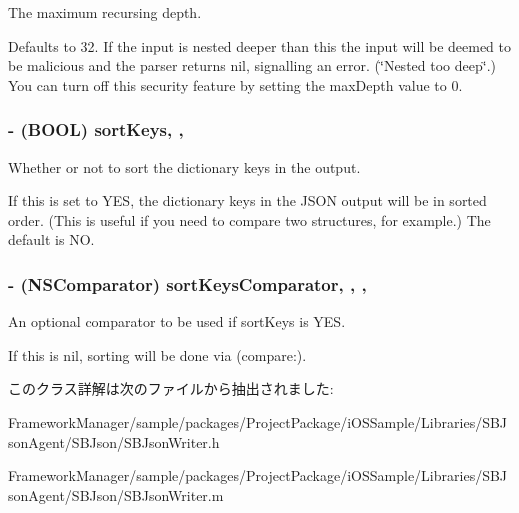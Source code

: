 The maximum recursing depth. 

Defaults to 32. If the input is nested deeper than this the input will be deemed to be malicious and the parser returns nil, signalling an error. (\char`\"{}\+Nested too deep\char`\"{}.) You can turn off this security feature by setting the max\+Depth value to 0. \hypertarget{interface_s_b_json_writer_af25807a58a322b56cb5d3593532228e5}{}
\subsubsection[{sort\+Keys}]{\setlength{\rightskip}{0pt plus 5cm}-\/ (B\+O\+O\+L) sort\+Keys\hspace{0.3cm}{\ttfamily [read]}, {\ttfamily [write]}, {\ttfamily [atomic]}}\label{interface_s_b_json_writer_af25807a58a322b56cb5d3593532228e5}


Whether or not to sort the dictionary keys in the output. 

If this is set to Y\+E\+S, the dictionary keys in the J\+S\+O\+N output will be in sorted order. (This is useful if you need to compare two structures, for example.) The default is N\+O. \hypertarget{interface_s_b_json_writer_ae1fb01a8ddff3f7825917ee2291bc5cb}{}
\subsubsection[{sort\+Keys\+Comparator}]{\setlength{\rightskip}{0pt plus 5cm}-\/ (N\+S\+Comparator) sort\+Keys\+Comparator\hspace{0.3cm}{\ttfamily [read]}, {\ttfamily [write]}, {\ttfamily [atomic]}, {\ttfamily [copy]}}\label{interface_s_b_json_writer_ae1fb01a8ddff3f7825917ee2291bc5cb}


An optional comparator to be used if sort\+Keys is Y\+E\+S. 

If this is nil, sorting will be done via (compare\+:). 

このクラス詳解は次のファイルから抽出されました\+:\begin{DoxyCompactItemize}
\item 
Framework\+Manager/sample/packages/\+Project\+Package/i\+O\+S\+Sample/\+Libraries/\+S\+B\+Json\+Agent/\+S\+B\+Json/S\+B\+Json\+Writer.\+h\item 
Framework\+Manager/sample/packages/\+Project\+Package/i\+O\+S\+Sample/\+Libraries/\+S\+B\+Json\+Agent/\+S\+B\+Json/S\+B\+Json\+Writer.\+m\end{DoxyCompactItemize}
